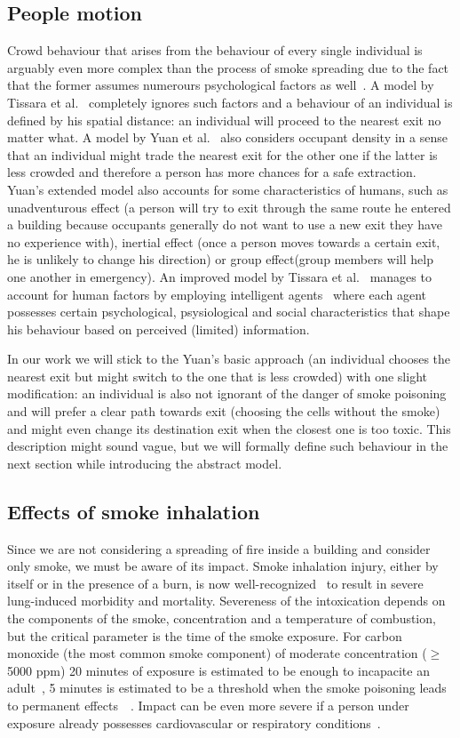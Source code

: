 \subsection{People motion}
Crowd behaviour that arises from the behaviour of every single individual is
arguably even more complex than the process of smoke spreading due to the fact
that the former assumes numerours psychological factors as well~\cite{Ying}.
A model by Tissara et al.~\cite{Tissera1} completely ignores such factors and a
behaviour of an individual is defined by his spatial distance: an individual
will proceed to the nearest exit no matter what.
A model by Yuan et al.~\cite{Yuan} also considers occupant density in a sense
that an individual might trade the nearest exit for the other one if the latter
is less crowded and therefore a person has more chances for a safe extraction.
Yuan's extended model also accounts for some characteristics of humans,
such as unadventurous effect (a person will try to exit through the same route
he entered a building because occupants generally do not want to use a new exit
they have no experience with), inertial effect (once a person moves towards a
certain exit, he is unlikely to change his direction) or group effect(group
members will help one another in emergency).
An improved model by Tissara et al.~\cite{Tissera2} manages to account for human
factors by employing intelligent agents~\cite{AI} where each agent possesses
certain psychological, psysiological and social characteristics that shape his
behaviour based on perceived (limited) information.

In our work we will stick to the Yuan's basic approach (an individual chooses
the nearest exit but might switch to the one that is less crowded) with one
slight modification: an individual is also not ignorant of the danger
of smoke poisoning and will prefer a clear path towards exit (choosing the
cells without the smoke) and might even change its destination exit when the
closest one is too toxic.
This description might sound vague, but we will formally define such behaviour
in the next section while introducing the abstract model.

\subsection{Effects of smoke inhalation}
Since we are not considering a spreading of fire inside a building and consider
only smoke, we must be aware of its impact. Smoke inhalation injury, either by
itself or in the presence of a burn, is now well-recognized~\cite{NCBI} to
result in severe lung-induced morbidity and mortality.
Severeness of the intoxication depends on the components of the smoke,
concentration and a temperature of combustion, but the critical parameter is
the time of the smoke exposure.
For carbon monoxide (the most common smoke component) of moderate concentration
($\geq$ 5000 ppm) 20 minutes of exposure is estimated to be enough to incapacite
an adult~\cite{CO1}, 5 minutes is estimated to be a threshold when
the smoke poisoning leads to permanent effects~\cite{NCBI}~\cite{CO2}.
Impact can be even more severe if a person under exposure already possesses
cardiovascular or respiratory conditions~\cite{Inhalation}.

